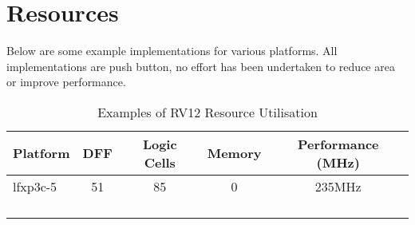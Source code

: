 \chapter{Resources}\label{resources}

Below are some example implementations for various platforms. All implementations are push button, no effort has been undertaken to reduce area or improve performance.
\setlength\LTleft{0pt}
\setlength\LTright{0pt}

\begin{longtable}[]{@{\extracolsep{\fill}}lcccc@{}}
	\toprule
	Platform & DFF & Logic Cells & Memory & Performance (MHz)\tabularnewline
	\midrule
	\endhead
	lfxp3c-5 & 51 & 85 & 0 & 235MHz\tabularnewline
	& & & &\tabularnewline
	& & & &\tabularnewline
	& & & &\tabularnewline
	\bottomrule
	\caption{Examples of RV12 Resource Utilisation}
	\label{tab:resource-utilistion}
\end{longtable}
